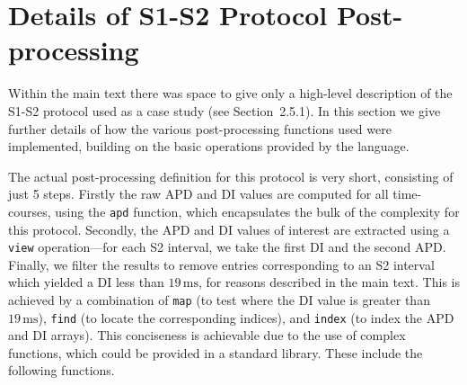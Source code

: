 \documentclass[preprint,authoryear,12pt]{elsarticle}
\newcommand{\code}[1]{\texttt{#1}}
\newcommand{\vu}[2]{\ensuremath{#1\,\mathrm{#2}}}
\begin{document}
\appendix

\makeatletter
\renewcommand{\thefigure}{S\@arabic\c@figure}
\renewcommand{\thetable}{S\@arabic\c@table}
\makeatother
\setcounter{figure}{0}
\setcounter{table}{0}

\section{Details of S1-S2 Protocol Post-processing}
\label{supp:case-study-details}

Within the main text there was space to give only a high-level description of the S1-S2 protocol used as a case study (see Section~2.5.1).
In this section we give further details of how the various post-processing functions used were implemented, building on the basic operations provided by the language.


The actual post-processing definition for this protocol is very short, consisting of just 5 steps.
Firstly the raw APD and DI values are computed for all time-courses, using the \code{apd} function, which encapsulates the bulk of the complexity for this protocol.
Secondly, the APD and DI values of interest are extracted using a \code{view} operation---for each S2 interval, we take the first DI and the second APD.
Finally, we filter the results to remove entries corresponding to an S2 interval which yielded a DI less than \vu{19}{ms}, for reasons described in the main text.
This is achieved by a combination of \code{map} (to test where the DI value is greater than \vu{19}{ms}), \code{find} (to locate the corresponding indices), and \code{index} (to index the APD and DI arrays).
This conciseness is achievable due to the use of complex functions, which could be provided in a standard library.
These include the following functions.
\end{document}
